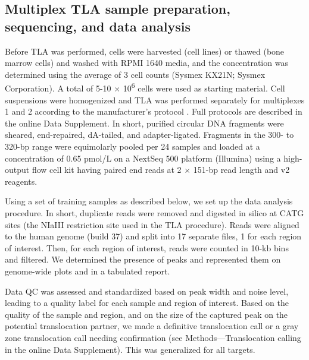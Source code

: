 \subsection[Multiplex TLA methods]{Multiplex TLA sample preparation, sequencing, and data analysis}
Before TLA was performed, cells were harvested (cell lines) or thawed (bone marrow cells) and washed with RPMI 1640 media, and the concentration was determined using the average of 3 cell counts (Sysmex KX21N; Sysmex Corporation). 
A total of 5-10 $\times$ 10\textsuperscript{6} cells were used as starting material. 
Cell suspensions were homogenized and TLA was performed separately for multiplexes 1 and 2 according to the manufacturer’s protocol \cite{de_Vree_2014}.
Full protocols are described in the online Data Supplement.
In short, purified circular DNA fragments were sheared, end-repaired, dA-tailed, and adapter-ligated. 
Fragments in the 300- to 320-bp range were equimolarly pooled per 24 samples and loaded at a concentration of 0.65 pmol/L on a NextSeq 500 platform (Illumina) using a high-output flow cell kit having paired end reads at 2 $\times$ 151-bp read length and v2 reagents. 

Using a set of training samples as described below, we set up the data analysis procedure. In short, duplicate reads were removed and digested in silico at CATG sites (the NIaIII restriction site used in the TLA procedure). 
Reads were aligned to the human genome (build 37) and split into 17 separate files, 1 for each region of interest. 
Then, for each region of interest, reads were counted in 10-kb bins and filtered. 
We determined the presence of peaks and represented them on genome-wide plots and in a tabulated report. 

Data QC was assessed and standardized based on peak width and noise level, leading to a quality label for each sample and region of interest. 
Based on the quality of the sample and region, and on the size of the captured peak on the potential translocation partner, we made a definitive translocation call or a gray zone translocation call needing confirmation (see Methods—Translocation calling in the online Data Supplement). 
This was generalized for all targets.

